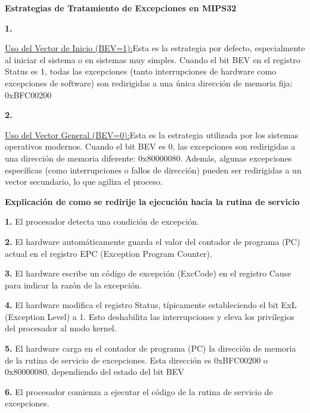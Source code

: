 \documentclass{article}
\begin{document}
\quad

\textbf{Estrategias de Tratamiento de Excepciones en MIPS32}

\quad

\textbf{1.   }{\underline{Uso del Vector de Inicio (BEV=1):}{Esta es la estrategia por defecto, especialmente al iniciar el sistema o en sistemas muy simples. Cuando el bit BEV en el registro Status es 1, todas las excepciones (tanto interrupciones de hardware como excepciones de software) son redirigidas a una única dirección de memoria fija: 0xBFC00200}

\quad

\textbf{2.   }{\underline{Uso del Vector General (BEV=0):}{Esta es la estrategia utilizada por los sistemas operativos modernos. Cuando el bit BEV es 0, las excepciones son redirigidas a una dirección de memoria diferente: 0x80000080. Además, algunas excepciones específicas (como interrupciones o fallos de dirección) pueden ser redirigidas a un vector secundario, lo que agiliza el proceso.}


\quad

\textbf{Explicación de como se redirije la ejecución hacia la rutina de servicio}

\quad

\textbf{1.   }{El procesador detecta una condición de excepción.}

\quad

\textbf{2.   }{El hardware automáticamente guarda el valor del contador de programa (PC) actual en el registro EPC (Exception Program Counter).}

\quad

\textbf{3.   }{El hardware escribe un código de excepción (ExcCode) en el registro Cause para indicar la razón de la excepción.}

\quad

\textbf{4.   }{El hardware modifica el registro Status, típicamente estableciendo el bit ExL (Exception Level) a 1. Esto deshabilita las interrupciones y eleva los privilegios del procesador al modo kernel.}

\quad

\textbf{5.   }{El hardware carga en el contador de programa (PC) la dirección de memoria de la rutina de servicio de excepciones. Esta dirección es 0xBFC00200 o 0x80000080, dependiendo del estado del bit BEV}

\quad

\textbf{6.   }{El procesador comienza a ejecutar el código de la rutina de servicio de excepciones.}

}}
\end{document}
